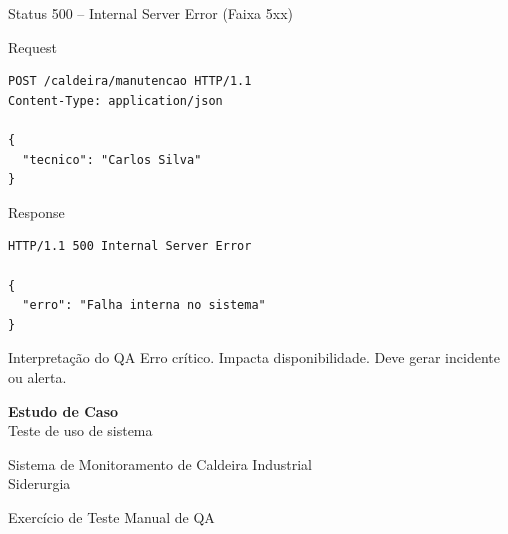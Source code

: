 \documentclass[9pt]{beamer}
\begin{document}
\begin{frame}[fragile]{Status 500 – Internal Server Error (Faixa 5xx)}

\begin{block}{Request}
\begin{verbatim}
POST /caldeira/manutencao HTTP/1.1
Content-Type: application/json

{
  "tecnico": "Carlos Silva"
}
\end{verbatim}
\end{block}

\begin{block}{Response}
\begin{verbatim}
HTTP/1.1 500 Internal Server Error

{
  "erro": "Falha interna no sistema"
}
\end{verbatim}
\end{block}

\begin{block}{Interpretação do QA}
Erro crítico.
Impacta disponibilidade.
Deve gerar incidente ou alerta.
\end{block}

\end{frame}
\begin{frame}
\centering
\vspace{1cm}

{\Huge \textbf{Estudo de Caso}} \\[0.5cm]
{\Large Teste de uso de sistema}

\vspace{1cm}

Sistema de Monitoramento de Caldeira Industrial \\
Siderurgia

\vfill
\small Exercício de Teste Manual de QA
\end{frame}
\end{document}
